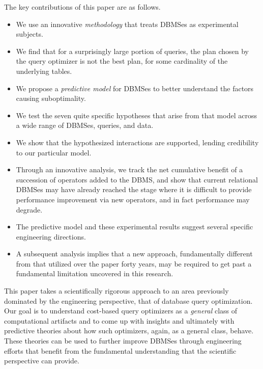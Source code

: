 \documentclass[prodmode,acmtods]{acmsmall}
\begin{document}
\pagebreak
The key contributions of this paper are as follows.
\begin{itemize} 
\item We use an innovative {\em methodology} that treats \hbox{DBMSes} as experimental subjects.

\item We find that for a surprisingly large portion of queries, the plan
  chosen  by the query optimizer is not the best plan, for some cardinality
  of the underlying tables.

\item We propose a {\em predictive model} for \hbox{DBMSes} to better
  understand the factors causing suboptimality.

\item We test the seven quite specific hypotheses that arise from that
  model across a wide range of DBMSes, queries, and data.

\item We show that the hypothesized interactions are  supported,
  lending credibility to our particular model.

\item Through an innovative
  analysis, we track the net cumulative benefit of a succession of operators
  added to the DBMS, and show that current relational DBMSes may have
  already reached the stage where it is difficult to provide performance
  improvement via new operators, and in fact performance may degrade.

\item The predictive model and these experimental results suggest several specific
  engineering directions.

\item A subsequent analysis implies that a new approach, fundamentally
  different from that utilized over the paper forty years, may be required
  to get past a fundamental limitation uncovered in this research.
\end{itemize}

This paper takes a scientifically rigorous approach to an
area previously dominated by the engineering perspective, that of database
query optimization.  Our goal is to \hbox{understand} cost-based query optimizers
as a {\em general} class of computational artifacts and to come up with
insights and ultimately with predictive theories about how such optimizers,
again, as a general class, behave.  These theories can be used to further
improve \hbox{DBMSes} through engineering \hbox{efforts} that benefit from the fundamental
understanding that the scientific perspective can provide.
\end{document}
